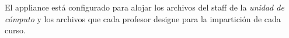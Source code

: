 El appliance est\'{a} configurado para alojar los archivos del staff de la \textit{unidad de c\'{o}mputo} y los archivos que cada profesor designe para la impartici\'{o}n de cada curso.

\begin{table}[H]
\caption{Limites establecidos en el appliance}{}
\label{tab:limites-appliance}
\noindent{} %
\end{table}

